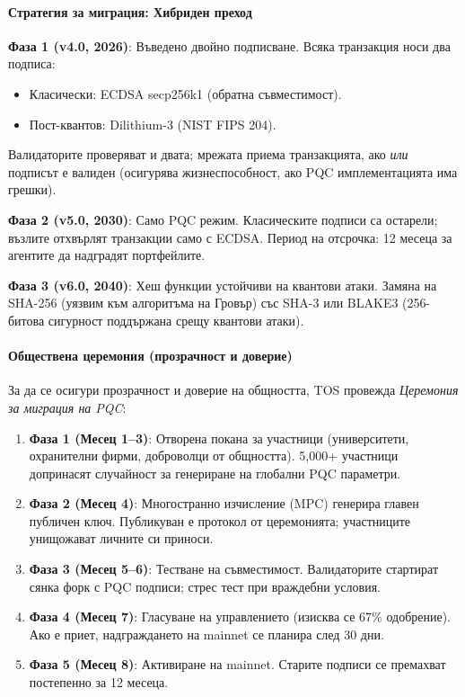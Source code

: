 \documentclass[11pt]{article}
\begin{document}
\paragraph{Стратегия за миграция: Хибриден преход}
\textbf{Фаза 1 (v4.0, 2026)}: Въведено двойно подписване. Всяка транзакция носи два подписа:
\begin{itemize}[noitemsep]
  \item Класически: ECDSA secp256k1 (обратна съвместимост).
  \item Пост-квантов: Dilithium-3 (NIST FIPS 204).
\end{itemize}
Валидаторите проверяват и двата; мрежата приема транзакцията, ако \emph{или} подписът е валиден (осигурява жизнеспособност, ако PQC имплементацията има грешки).

\textbf{Фаза 2 (v5.0, 2030)}: Само PQC режим. Класическите подписи са остарели; възлите отхвърлят транзакции само с ECDSA. Период на отсрочка: 12 месеца за агентите да надградят портфейлите.

\textbf{Фаза 3 (v6.0, 2040)}: Хеш функции устойчиви на квантови атаки. Замяна на SHA-256 (уязвим към алгоритъма на Гровър) със SHA-3 или BLAKE3 (256-битова сигурност поддържана срещу квантови атаки).

\paragraph{Обществена церемония (прозрачност и доверие)}
За да се осигури прозрачност и доверие на общността, TOS провежда \emph{Церемония за миграция на PQC}:
\begin{enumerate}[noitemsep]
  \item \textbf{Фаза 1 (Месец 1--3)}: Отворена покана за участници (университети, охранителни фирми, доброволци от общността). 5,000+ участници допринасят случайност за генериране на глобални PQC параметри.
  \item \textbf{Фаза 2 (Месец 4)}: Многостранно изчисление (MPC) генерира главен публичен ключ. Публикуван е протокол от церемонията; участниците унищожават личните си приноси.
  \item \textbf{Фаза 3 (Месец 5--6)}: Тестване на съвместимост. Валидаторите стартират сянка форк с PQC подписи; стрес тест при враждебни условия.
  \item \textbf{Фаза 4 (Месец 7)}: Гласуване на управлението (изисква се 67\% одобрение). Ако е приет, надграждането на mainnet се планира след 30 дни.
  \item \textbf{Фаза 5 (Месец 8)}: Активиране на mainnet. Старите подписи се премахват постепенно за 12 месеца.
\end{enumerate}
\end{document}

